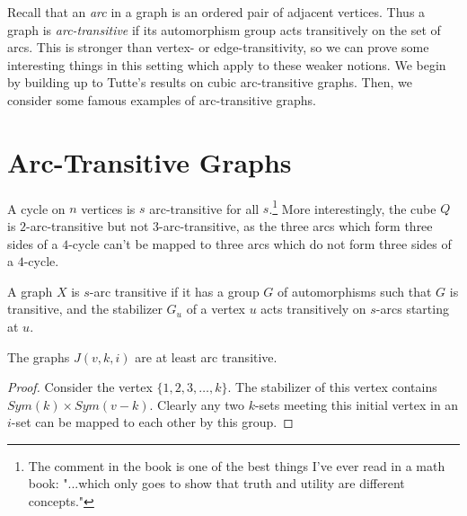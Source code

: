 \renewcommand{\exc}[1]{\subsubsection*{Exercise 4.#1}}


Recall that an \textit{arc} in a graph is an ordered pair of adjacent vertices.  Thus a graph is \textit{arc-transitive} if its automorphism group acts transitively on the set of arcs.  This is stronger than vertex- or edge-transitivity, so we can prove some interesting things in this setting which apply to these weaker notions.  We begin by building up to Tutte's results on cubic arc-transitive graphs.  Then, we consider some famous examples of arc-transitive graphs.

\section*{Arc-Transitive Graphs}

A cycle on $n$ vertices is $s$ arc-transitive for all $s$.\footnote{The comment in the book is one of the best things I've ever read in a math book: "...which only goes to show that truth and utility are different concepts."}  More interestingly, the cube $Q$ is $2$-arc-transitive but not $3$-arc-transitive, as the three arcs which form three sides of a $4$-cycle can't be mapped to three arcs which do not form three sides of a $4$-cycle.

A graph $X$ is $s$-arc transitive if it has a group $G$ of automorphisms such that $G$ is transitive, and the stabilizer $G_u$ of a vertex $u$ acts transitively on $s$-arcs starting at $u$.

\begin{lemma}
	The graphs $J(v,k,i)$ are at least arc transitive.
\end{lemma}
\begin{proof}
	Consider the vertex $\{1,2,3,\dots,k\}$.  The stabilizer of this vertex contains $Sym(k)\times Sym(v-k)$.  Clearly any two $k$-sets meeting this initial vertex in an $i$-set can be mapped to each other by this group.
\end{proof}


